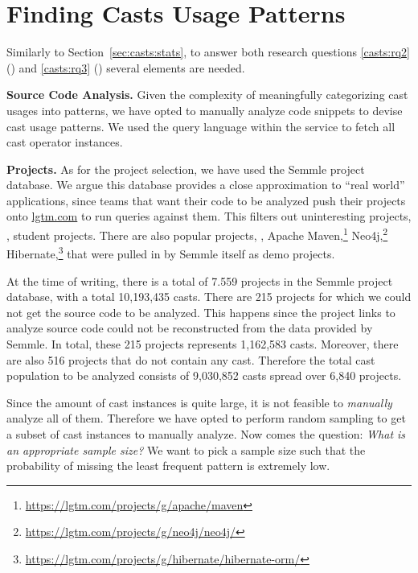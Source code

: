 \section{Finding Casts Usage Patterns}
\label{sec:casts:methodology}

Similarly to Section~\ref{sec:casts:stats},
%
%
to answer both research questions \ref{casts:rq2} (\emph{\crqB}) and \ref{casts:rq3} (\emph{\crqC}) several elements are needed.

\textbf{Source Code Analysis.}
Given the complexity of meaningfully categorizing cast usages into patterns,
we have opted to manually analyze code snippets to devise cast usage patterns.
We used the \ql{} query language within the \lgtm{} service to fetch all cast operator instances.

\textbf{Projects.}
As for the project selection, we have used the Semmle project database.
We argue this database provides a close approximation to ``real world'' applications, since teams that want their code to be analyzed push their projects onto \href{https://lgtm.com}{lgtm.com} to run queries against them.
This filters out uninteresting projects, \eg, student projects.
There are also popular projects, \eg,
Apache Maven,\footnote{\url{https://lgtm.com/projects/g/apache/maven}}
Neo4j,\footnote{\url{https://lgtm.com/projects/g/neo4j/neo4j/}}
Hibernate,\footnote{\url{https://lgtm.com/projects/g/hibernate/hibernate-orm/}}
that were pulled in by Semmle itself as demo projects.


At the time of writing, there is a total of 7.559 projects in the Semmle project database, with a total 10,193,435 casts.
%
%
There are 215 projects for which we could not get the source code to be analyzed.
This happens since the project links to analyze source code could not be reconstructed from the data provided by Semmle.
In total, these 215 projects represents 1,162,583 casts.
Moreover, there are also 516 projects that do not contain any cast.
Therefore the total cast population to be analyzed consists of 9,030,852 casts spread over 6,840 projects.

%
Since the amount of cast instances is quite large, it is not feasible to \emph{manually} analyze all of them.
Therefore we have opted to perform random sampling to get a subset of cast instances to manually analyze.
Now comes the question: \emph{What is an appropriate sample size?}
We want to pick a sample size such that the probability of missing the least frequent pattern is extremely low.

